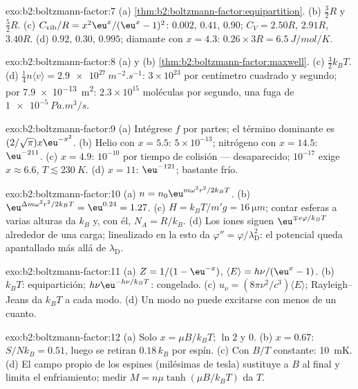 \begin{solution}{exo:b2:boltzmann-factor:7}
(a) \cref{thm:b2:boltzmann-factor:equipartition}. (b) $\tfrac32R$ y
$\tfrac52R$. (c) $C_{\text{vib}}/R = x^2\eu^x/(\eu^x - 1)^2$: $0.002$, $0.41$, $0.90$;
$C_V = 2.50R$, $2.91R$, $3.40R$. (d) $0.92$, $0.30$, $0.995$; diamante con $x = 4.3$:
$0.26 \times 3R = \qty{6.5}{J/mol/K}$.
\end{solution}

\begin{solution}{exo:b2:boltzmann-factor:8}
(a) y (b) \cref{thm:b2:boltzmann-factor:maxwell}. (c) $\tfrac32k_BT$. (d)
$\tfrac14n\langle v\rangle = \qty{2.9e27}{m^{-2}.s^{-1}}$: $3 \times 10^{23}$ por centímetro
cuadrado y segundo; por \qty{7.9e-13}{m^2}: $2.3 \times 10^{15}$
moléculas por segundo, una fuga de $\qty{1e-5}{Pa.m^3/s}$.
\end{solution}

\begin{solution}{exo:b2:boltzmann-factor:9}
(a) Intégrese $f$ por partes; el término dominante es $(2/\sqrt\pi)x\eu^{-x^2}$. (b)
Helio con $x = 5.5$: $5 \times 10^{-13}$; nitrógeno con $x = 14.5$: $\eu^{-211}$. (c) $x =
4.9$: $10^{-10}$ por tiempo de colisión --- desaparecido; $10^{-17}$ exige $x \approx 6.6$,
$T \lesssim \qty{230}{K}$. (d) $x = 11$: $\eu^{-121}$; bastante frío.
\end{solution}

\begin{solution}{exo:b2:boltzmann-factor:10}
(a) $n = n_0\eu^{m\omega^2r^2/2k_BT}$. (b) $\eu^{\Delta m\omega^2r^2/2k_BT} = \eu^{0.24} =
1.27$. (c) $H = k_BT/m'g = \qty{16}{\micro m}$; contar esferas a
varias alturas da $k_B$ y, con él, $N_A = R/k_B$. (d) Los iones siguen
$\eu^{\mp e\varphi/k_BT}$ alrededor de una carga; linealizado en la 
esto da $\varphi'' = \varphi/\lambda_{\text{D}}^2$: el potencial queda apantallado
más allá de $\lambda_{\text{D}}$.
\end{solution}

\begin{solution}{exo:b2:boltzmann-factor:11}
(a) $Z = 1/(1 - \eu^{-x})$, $\langle E\rangle = h\nu/(\eu^x - 1)$. (b) $k_BT$:
equipartición; $h\nu\eu^{-h\nu/k_BT}$: congelado. (c) $u_\nu = (8\pi\nu^2/c^3)\langle E
\rangle$; Rayleigh--Jeans da $k_BT$ a cada modo. (d) Un modo no puede
excitarse con menos de un cuanto.
\end{solution}

\begin{solution}{exo:b2:boltzmann-factor:12}
(a) Solo $x = \mu B/k_BT$; $\ln 2$ y $0$. (b) $x = 0.67$: $S/Nk_B = 0.51$, luego
se retiran $0.18\,k_B$ por espín. (c) Con $B/T$ constante: \qty{10}{mK}. (d) El campo
propio de los espines (milésimas de tesla) sustituye a $B$ al final y limita el enfriamiento;
medir $M = n\mu\tanh(\mu B/k_BT)$ da $T$.
\end{solution}

